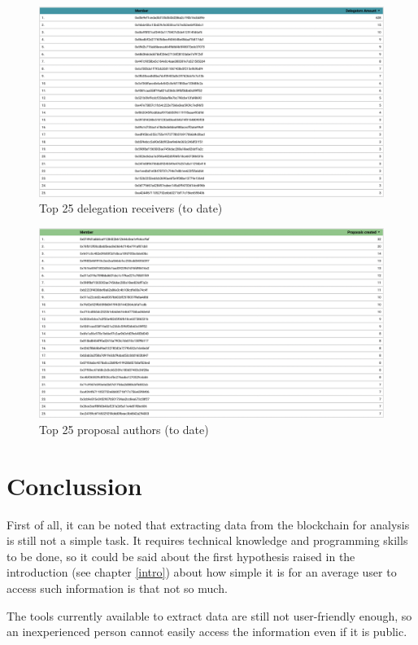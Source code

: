 \documentclass[MSE,Master,english]{twbook}%
\begin{document}
\begin{figure}[H]
  \centering
  \includegraphics[width=\textwidth]{metrics/top_delegates.png}
  \caption{Top 25 delegation receivers (to date)}
  \label{fig:top_delegates}
\end{figure}
\begin{figure}[H]
  \centering
  \includegraphics[width=\textwidth]{metrics/top_authors.png}
  \caption{Top 25 proposal authors (to date)}
  \label{fig:top_authors}
\end{figure}

\chapter{Conclussion\label{conclussion}}
First of all, it can be noted that extracting data from the blockchain for analysis is still not a simple task. It requires technical knowledge and programming skills to be done, so it could be said about the first hypothesis raised in the introduction (see chapter \ref{intro}) about how simple it is for an average user to access such information is that not so much.

The tools currently available to extract data are still not user-friendly enough, so an inexperienced person cannot easily access the information even if it is public. \\
\end{document}

